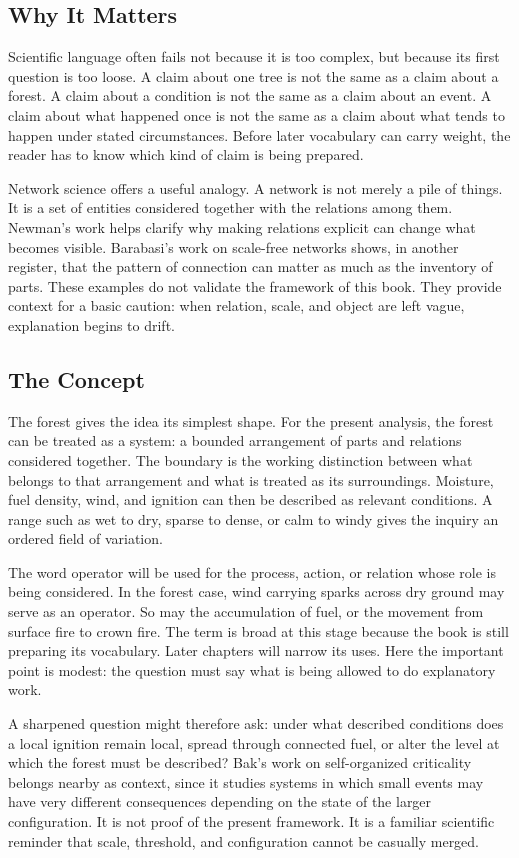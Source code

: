 \documentclass[11pt,a4paper,openany]{book}
\begin{document}
\subsection{Why It Matters}
Scientific language often fails not because it is too complex, but because its first question is too loose. A claim about one tree is not the same as a claim about a forest. A claim about a condition is not the same as a claim about an event. A claim about what happened once is not the same as a claim about what tends to happen under stated circumstances. Before later vocabulary can carry weight, the reader has to know which kind of claim is being prepared. \cite{raf_networks,bak_soc}\par
Network science offers a useful analogy. A network is not merely a pile of things. It is a set of entities considered together with the relations among them. Newman's work helps clarify why making relations explicit can change what becomes visible. Barabasi's work on scale-free networks shows, in another register, that the pattern of connection can matter as much as the inventory of parts. These examples do not validate the framework of this book. They provide context for a basic caution: when relation, scale, and object are left vague, explanation begins to drift.\par
\subsection{The Concept}
The forest gives the idea its simplest shape. For the present analysis, the forest can be treated as a system: a bounded arrangement of parts and relations considered together. The boundary is the working distinction between what belongs to that arrangement and what is treated as its surroundings. Moisture, fuel density, wind, and ignition can then be described as relevant conditions. A range such as wet to dry, sparse to dense, or calm to windy gives the inquiry an ordered field of variation. \cite{raf_networks,bak_soc}\par
The word operator will be used for the process, action, or relation whose role is being considered. In the forest case, wind carrying sparks across dry ground may serve as an operator. So may the accumulation of fuel, or the movement from surface fire to crown fire. The term is broad at this stage because the book is still preparing its vocabulary. Later chapters will narrow its uses. Here the important point is modest: the question must say what is being allowed to do explanatory work.\par
A sharpened question might therefore ask: under what described conditions does a local ignition remain local, spread through connected fuel, or alter the level at which the forest must be described? Bak's work on self-organized criticality belongs nearby as context, since it studies systems in which small events may have very different consequences depending on the state of the larger configuration. It is not proof of the present framework. It is a familiar scientific reminder that scale, threshold, and configuration cannot be casually merged.\par
\end{document}
